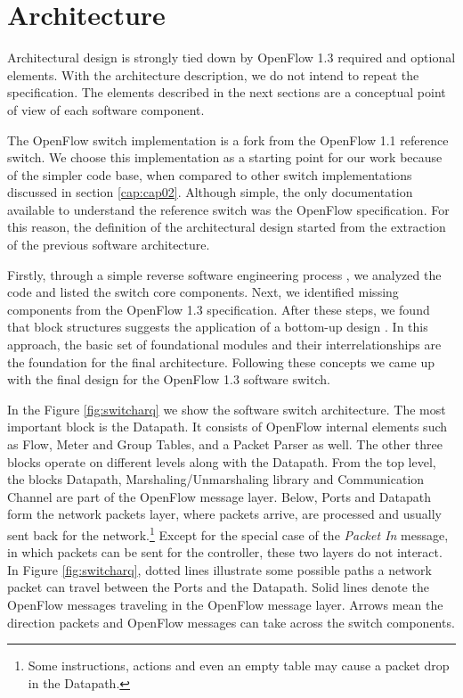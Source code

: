 \chapter{Architecture}
\label{cap:cap03}

Architectural design is strongly tied down by OpenFlow 1.3 required and optional elements. With the architecture description, we do not intend to repeat the specification. The elements described in the next sections are a conceptual point of view of each software component. 

The OpenFlow switch implementation is a fork from the OpenFlow 1.1 reference switch. We choose this implementation as a starting point for our work because of the simpler code base, when compared to other switch implementations discussed in section \ref{cap:cap02}. Although simple, the only documentation available to understand the reference switch was the OpenFlow specification. For this reason, the definition of the architectural design started from the extraction of the previous software architecture. 

Firstly, through a simple reverse software engineering process \cite{Sommerville:2001:SE:375369}, we analyzed the code and listed the switch core components. Next, we identified missing components from the OpenFlow 1.3 specification. After these steps, we found that block structures suggests the application of a bottom-up design \cite{vonMayrhauser:1990:SEM:79005}. In this approach, the basic set of foundational modules and their interrelationships are the foundation for the final architecture. Following these concepts we came up with the final design for the OpenFlow 1.3 software switch.

In the Figure \ref{fig:switcharq} we show the software switch architecture. The most important block is the Datapath. It consists of OpenFlow internal elements such as Flow, Meter and Group Tables, and a Packet Parser as well. The other three blocks operate on different levels along with the Datapath. From the top level, the blocks Datapath, Marshaling/Unmarshaling library and Communication Channel are part of the OpenFlow message layer. Below, Ports and Datapath form the network packets layer, where packets arrive, are processed and usually sent back for the network.\footnote{Some instructions, actions and even an empty table may cause a packet drop in the Datapath.} Except for the special case of the \textit{Packet In} message, in which packets can be sent for the controller, these two layers do not interact. In Figure \ref{fig:switcharq}, dotted lines illustrate some possible paths a network packet can travel between the Ports and the Datapath. Solid lines denote the OpenFlow messages traveling in the OpenFlow message layer. Arrows mean the direction packets and OpenFlow messages can take across the switch components. 


